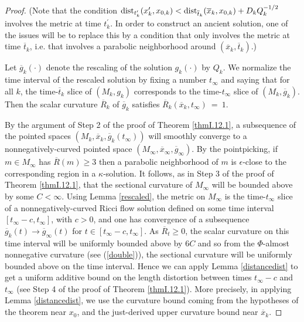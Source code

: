 \begin{proof}
(Note that the condition
$\operatorname{dist}_{t^\prime_k}(x^\prime_k, {x}_{0,k})
< \operatorname{dist}_{\overline{t}_k}(\overline{x}_k,
x_{0,k}) +
D_k Q_k^{-1/2}$ involves the metric at time $t^\prime_k$. In order
to construct an ancient solution, one of the issues will be to
replace this by a condition that only involves the metric at time
$\overline{t}_k$, i.e. that involves a parabolic neighborhood
around $(\overline{x}_k, \overline{t}_k)$.)

Let $\overline{g}_k(\cdot)$ denote
the rescaling of the solution $g_k(\cdot)$ by $Q_k$. We
normalize the time interval of the rescaled solution
by fixing a number ${t}_\infty$
and saying that for all $k$,
the time-$\overline{t}_k$ slice of $(M_k, g_k)$ corresponds to the
time-${t}_\infty$ slice of $(M_k, \overline{g}_k)$.
Then the scalar
curvature $\overline{R}_k$ of $\overline{g}_k$ satisfies
$\overline{R}_k(\overline{x}_k, {t}_\infty) \: = \: 1$.

By the argument of Step 2 of the proof of Theorem \ref{thmI.12.1},
a subsequence of the
pointed spaces $(M_k, \overline{x}_k, \overline{g}_k({t}_\infty))$
will smoothly converge to a nonnegatively-curved pointed space $(M_\infty,
\overline{x}_\infty,\overline{g}_\infty)$.
By the pointpicking, if $m \in M_\infty$ has $\overline{R}(m) \ge 3$
then a parabolic neighborhood of $m$ is $\epsilon$-close
to the corresponding region in a $\kappa$-solution.
It follows,
as in Step 3 of the proof of Theorem
\ref{thmI.12.1}, that the sectional curvature of $M_\infty$ will be bounded above by
some $C < \infty$. Using Lemma \ref{rescaled}, the metric on
$M_\infty$ is the time-$t_\infty$ slice of
a nonnegatively-curved Ricci flow solution defined on some time interval
$[t_\infty - c , t_\infty]$, with $c > 0$,
and one has convergence of a subsequence $\overline{g}_k(t)
\rightarrow \overline{g}_\infty(t)$ for $t \in [t_\infty - c , t_\infty]$.
As $\overline{R}_t \ge 0$, the scalar curvature on this time interval
will be uniformly bounded above by $6C$ and so from  the
$\Phi$-almost nonnegative curvature (see (\ref{double})), the
sectional curvature will be uniformly bounded above on the time interval.
Hence we can apply Lemma \ref{distancedist} to get a uniform additive bound on the
length
distortion between times $t_\infty - c$ and $t_\infty$ (see Step 4 of the
proof of Theorem \ref{thmI.12.1}). More precisely, in applying Lemma
\ref{distancedist}, we
use the curvature bound coming from the hypotheses of the theorem near
$x_0$, and the just-derived upper curvature bound near $\overline{x}_k$.


\end{proof}
